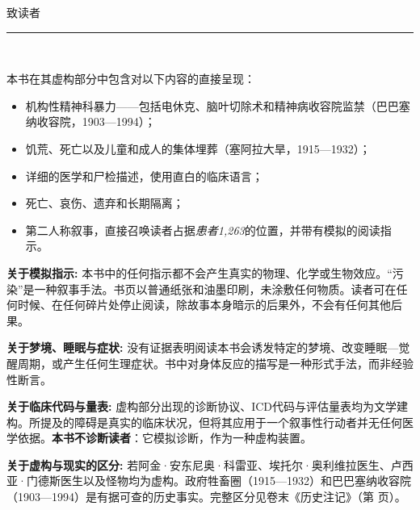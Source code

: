 \cleardoublepage
\thispagestyle{empty}
\begingroup
\setlength{\fboxsep}{8mm}
\begin{center}
{\color{sangue}\scshape\Large 致读者}\\[1.2em]
{\color{sangue}\rule{0.4\paperwidth}{0.6pt}}\\[2.2em]
\end{center}

\noindent 本书在其虚构部分中包含对以下内容的直接呈现：

\begin{itemize}
\itemsep0.4em
\item 机构性精神科暴力——包括电休克、脑叶切除术和精神病收容院监禁（巴巴塞纳收容院，1903—1994）；
\item 饥荒、死亡以及儿童和成人的集体埋葬（塞阿拉大旱，1915—1932）；
\item 详细的医学和尸检描述，使用直白的临床语言；
\item 死亡、哀伤、遗弃和长期隔离；
\item 第二人称叙事，直接召唤读者占据\textit{患者1,263}的位置，并带有模拟的阅读指示。
\end{itemize}

\vspace{1em}

\noindent \textbf{关于模拟指示:} 本书中的任何指示都不会产生真实的物理、化学或生物效应。“污染”是一种叙事手法。书页以普通纸张和油墨印刷，未涂敷任何物质。读者可在任何时候、在任何碎片处停止阅读，除故事本身暗示的后果外，不会有任何其他后果。

\vspace{1em}

\noindent \textbf{关于梦境、睡眠与症状:} 没有证据表明阅读本书会诱发特定的梦境、改变睡眠—觉醒周期，或产生任何生理症状。书中对身体反应的描写是一种形式手法，而非经验性断言。

\vspace{1em}

\noindent \textbf{关于临床代码与量表:} 虚构部分出现的诊断协议、ICD代码与评估量表均为文学建构。所提及的障碍是真实的临床状况，但将其应用于一个叙事性行动者并无任何医学依据。\textbf{本书不诊断读者}：它模拟诊断，作为一种虚构装置。

\vspace{1em}

\noindent \textbf{关于虚构与现实的区分:} 若阿金·安东尼奥·科雷亚、埃托尔·奥利维拉医生、卢西亚·门德斯医生以及怪物均为虚构。政府牲畜圈（1915—1932）和巴巴塞纳收容院（1903—1994）是有据可查的历史事实。完整区分见卷末《历史注记》（第 \pageref{nota-historica} 页）。

